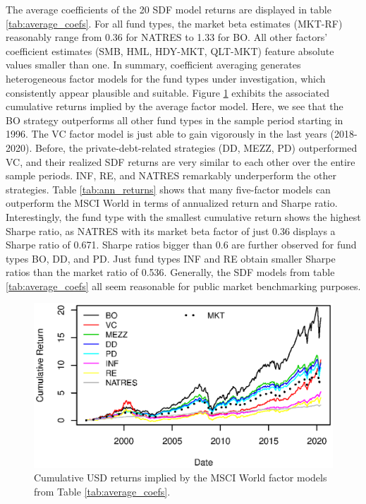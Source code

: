 \documentclass[12pt]{article}
\begin{document}
The average coefficients of the 20 SDF model returns are displayed in table \ref{tab:average_coefs}.
For all fund types, the market beta estimates (MKT-RF) reasonably range from 0.36 for NATRES to 1.33 for BO.
All other factors' coefficient estimates (SMB, HML, HDY-MKT, QLT-MKT) feature absolute values smaller than one.
In summary, coefficient averaging generates heterogeneous factor models for the fund types under investigation, which consistently appear plausible and suitable.
Figure \ref{fig:cum_returns} exhibits the associated cumulative returns implied by the average factor model.
Here, we see that the BO strategy outperforms all other fund types in the sample period starting in 1996.
The VC factor model is just able to gain vigorously in the last years (2018-2020).
Before, the private-debt-related strategies (DD, MEZZ, PD) outperformed VC, and their realized SDF returns are very similar to each other over the entire sample periods.
INF, RE, and NATRES remarkably underperform the other strategies.
Table \ref{tab:ann_returns} shows that many five-factor models can outperform the MSCI World in terms of annualized return and Sharpe ratio. 
Interestingly, the fund type with the smallest cumulative return shows the highest Sharpe ratio, as NATRES with its market beta factor of just 0.36 displays a Sharpe ratio of 0.671.
Sharpe ratios bigger than 0.6 are further observed for fund types BO, DD, and PD.
Just fund types INF and RE obtain smaller Sharpe ratios than the market ratio of 0.536.
Generally, the SDF models from table \ref{tab:average_coefs} all seem reasonable for public market benchmarking purposes.

\begin{figure}[H]
	\centering
	\includegraphics{Figures/Cumulative_Returns.eps}
	\caption{Cumulative USD returns implied by the MSCI World factor models from Table \ref{tab:average_coefs}.}
	\label{fig:cum_returns}   
\end{figure}
\end{document}
